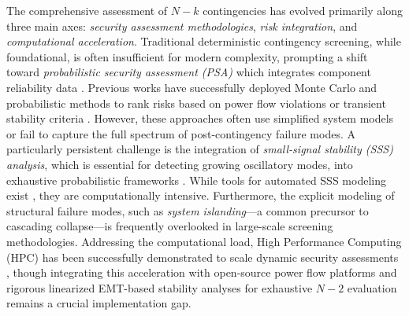 \documentclass[journal]{IEEEtran}
\begin{document}
The comprehensive assessment of $N-k$ contingencies has evolved primarily along three main axes: \textit{security assessment methodologies}, \textit{risk integration}, and \textit{computational acceleration}. Traditional deterministic contingency screening, while foundational, is often insufficient for modern complexity, prompting a shift toward     \textit{probabilistic security assessment (PSA)} which integrates component reliability data \cite{billinton1994reliability, ieee_rts96, agreira, perkin}. Previous works have successfully deployed Monte Carlo and probabilistic methods to rank risks based on power flow violations or transient stability criteria \cite{PSA_1_Pereira, shahzad, donde, contingency_screening_islanding}. However, these approaches often use simplified system models or fail to capture the full spectrum of post-contingency failure modes. A particularly persistent challenge is the integration of \textit{small-signal stability (SSS) analysis}, which is essential for detecting growing oscillatory modes, into exhaustive probabilistic frameworks \cite{bu, tabrizchi}. While tools for automated SSS modeling exist \cite{arevalo_sstoolbox}, they are computationally intensive. Furthermore, the explicit modeling of structural failure modes, such as \textit{system islanding}—a common precursor to cascading collapse—is frequently overlooked in large-scale screening methodologies. Addressing the computational load, High Performance Computing (HPC) has been successfully demonstrated to scale dynamic security assessments \cite{konstantelos2017}, though integrating this acceleration with open-source power flow platforms \cite{veragrid} and rigorous linearized EMT-based stability analyses for exhaustive $N-2$ evaluation remains a crucial implementation gap. 
\end{document}

